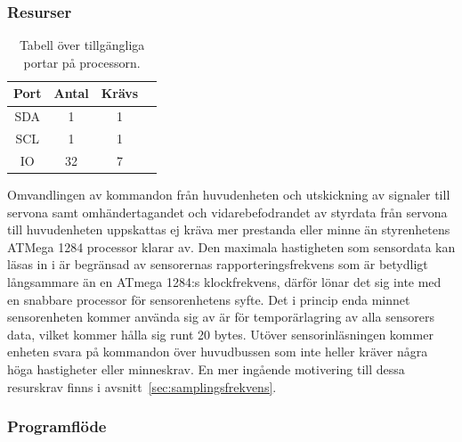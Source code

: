 \documentclass{article}
\begin{document}
\subsubsection{Resurser}
\begin{table}[H]
  \centering
  \begin{tabular}{ | c | c | c | c |}
    \hline
    \textbf{Port} & \textbf{Antal} & \textbf{Krävs} \\
    \hline
    SDA & 1 & 1 \\
    \hline
    SCL & 1 & 1 \\
    \hline
    IO & 32 & 7 \\
    \hline
  \end{tabular}
  \caption{Tabell över tillgängliga portar på processorn.}
\end{table}

Omvandlingen av kommandon från huvudenheten och utskickning av signaler till servona samt omhändertagandet och vidarebefodrandet av styrdata från servona till huvudenheten uppskattas ej kräva mer prestanda eller minne än styrenhetens ATMega 1284 processor klarar av.
\newline\newline
Den maximala hastigheten som sensordata kan läsas in i är begränsad av sensorernas rapporteringsfrekvens som är betydligt långsammare än en ATmega 1284:s klockfrekvens, därför lönar det sig inte med en snabbare processor för sensorenhetens syfte. Det i princip enda minnet sensorenheten kommer använda sig av är för temporärlagring av alla sensorers data, vilket kommer hålla sig runt 20 bytes. Utöver sensorinläsningen kommer enheten svara på kommandon över huvudbussen som inte heller kräver några höga hastigheter eller minneskrav. En mer ingående motivering till dessa resurskrav finns i avsnitt~\ref{sec:samplingsfrekvens}.

\subsubsection{Programflöde}
\end{document}
